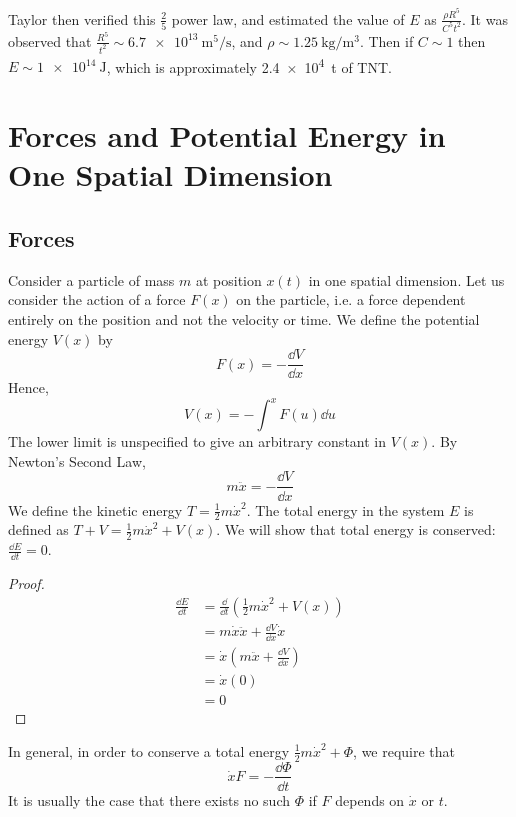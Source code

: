\documentclass{article}
\begin{document}
Taylor then verified this $\frac{2}{5}$ power law, and estimated the value of $E$ as $\frac{\rho R^5}{C^5 t^2}$. It was observed that $\frac{R^5}{t^2} \sim \SI{6.7e13}{\metre\tothe{5}\per\second}$, and $\rho\sim\SI{1.25}{\kilogram\per\metre\cubed}$. Then if $C \sim 1$ then $E \sim \SI{1e14}{\joule}$, which is approximately \SI{2.4e4}{\tonne} of TNT.

\section{Forces and Potential Energy in One Spatial Dimension}
\subsection{Forces}
Consider a particle of mass $m$ at position $x(t)$ in one spatial dimension. Let us consider the action of a force $F(x)$ on the particle, i.e. a force dependent entirely on the position and not the velocity or time. We define the potential energy $V(x)$ by
\[ F(x) = -\frac{\dd{V}}{\dd{x}} \]
Hence,
\[ V(x) = - \int^x F(u) \dd{u} \]
The lower limit is unspecified to give an arbitrary constant in $V(x)$. By Newton's Second Law,
\[ m\ddot{x} = -\frac{\dd{V}}{\dd{x}} \]
We define the kinetic energy $T = \frac{1}{2}m\dot x^2$. The total energy in the system $E$ is defined as $T + V = \frac{1}{2} m \dot x^2 + V(x)$. We will show that total energy is conserved: $\frac{\dd{E}}{\dd{t}} = 0$.
\begin{proof}
    \begin{align*}
        \frac{\dd{E}}{\dd{t}} & = \frac{\dd}{\dd{t}}\left( \frac{1}{2}m\dot x^2 + V(x) \right) \\
                              & = m\dot x \ddot x + \frac{\dd{V}}{\dd{x}} \dot x               \\
                              & = \dot x\left( m \ddot x + \frac{\dd{V}}{\dd{x}} \right)       \\
                              & = \dot x ( 0 )                                                 \\
                              & = 0
    \end{align*}
\end{proof}
\noindent In general, in order to conserve a total energy $\frac{1}{2}m\dot x^2 + \Phi$, we require that
\[ \dot x F = -\frac{\dd \Phi}{\dd{t}} \]
It is usually the case that there exists no such $\Phi$ if $F$ depends on $\dot x$ or $t$.
\end{document}
